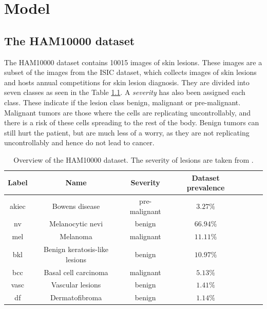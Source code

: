 \chapter{Model}\label{sec:model}
\section{The HAM10000 dataset}
The HAM10000 dataset contains 10015 images of skin lesions.
These images are a subset of the images from the ISIC dataset\cite{ISIC_Dataset_2018},
which collects images of skin lesions and hosts annual competitions for skin lesion diagnosis.
They are divided into seven classes as seen in the Table \ref{table:ham10000}.
A \textit{severity} has also been assigned each class.
These indicate if the lesion class benign, malignant or pre-malignant.
Malignant tumors are those where the cells are replicating uncontrollably,
and there is a risk of these cells spreading to the rest of the body.
Benign tumors can still hurt the patient, but are much less of a worry,
as they are not replicating uncontrollably and hence do not lead to cancer.

\begin{table}[ht]
\begin{center}
\begin{tabular}{|c|c|c|c|c|c|c|}
\hline
Label    & Name                          & Severity      & Dataset prevalence \\ \hline
akiec    & Bowens disease                & pre-malignant & $3.27\%$           \\ \hline
nv       & Melanocytic nevi              & benign        & $66.94\%$          \\ \hline
mel      & Melanoma                      & malignant     & $11.11\%$          \\ \hline
bkl      & Benign keratosis-like lesions & benign        & $10.97\%$          \\ \hline
bcc      & Basal cell carcinoma          & malignant     & $5.13\%$           \\ \hline
vasc     & Vascular lesions              & benign        & $1.41\%$           \\ \hline
df       & Dermatofibroma                & benign        & $1.14\%$           \\ \hline
\end{tabular}
\end{center}

\caption{Overview of the HAM10000 dataset. The severity of lesions are taken from \cite{dermatologi-laerebogen}.}
\label{table:ham10000}
\end{table}

